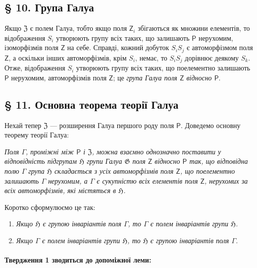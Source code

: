 \documentclass[11pt]{article}
\begin{document}
\subsection*{§ 10. Група Галуа}\label{die-galoissche-gruppe}

Якщо \(\mathfrak Z\) є полем Галуа, тобто якщо поля \(\mathsf{Z}_i\) збігаються як множини елементів, то відображення \(S_i\) утворюють групу всіх таких, що залишають \(\mathsf P\) нерухомим, ізоморфізмів поля \(\mathsf{Z}\) на себе. Справді, кожний добуток \(S_iS_j\) є автоморфізмом поля \(\mathsf{Z}\), а оскільки інших автоморфізмів, крім \(S_i\), немає, то \(S_iS_j\) дорівнює деякому \(S_k\). Отже, відображення \(S_i\) утворюють групу всіх таких, що поелементно залишають \(\mathsf P\) нерухомим, автоморфізмів поля \(\mathsf{Z}\); це \emph{група Галуа поля \(\mathsf{Z}\) відносно \(\mathsf P\)}.

\subsection*{§ 11. Основна теорема теорії Галуа}\label{der-hauptsatz-der-galoisschen-theorie}

Нехай тепер \(\mathfrak Z\) --- розширення Галуа першого роду поля \(\mathsf P\). Доведемо основну теорему теорії Галуа:

\emph{Поля \(\Gamma\), проміжні між \(\mathsf P\) і \(\mathfrak Z\), можна взаємно однозначно поставити у відповідність підгрупам \(\mathfrak H\) групи Галуа \(\mathfrak G\) поля \(\mathsf{Z}\) відносно \(\mathsf P\) так, що відповідна полю \(\Gamma\) група \(\mathfrak H\) складається з усіх автоморфізмів поля \(\mathsf{Z}\), що поелементно залишають \(\Gamma\) нерухомим, а \(\Gamma\) є сукупністю всіх елементів поля \(\mathsf{Z}\), нерухомих за всіх автоморфізмів, які містяться в \(\mathfrak H\).}

Коротко сформулюємо це так:

\begin{enumerate}
\item \emph{Якщо \(\mathfrak H\) є групою інваріантів поля \(\Gamma\), то \(\Gamma\) є полем інваріантів групи \(\mathfrak H\).}
\item \emph{Якщо \(\Gamma\) є полем інваріантів групи \(\mathfrak H\), то \(\mathfrak H\) є групою інваріантів поля \(\Gamma\).}
\end{enumerate}

\paragraph{Твердження 1 зводиться до допоміжної леми:}\label{laesst-sich-zurueckfuehren-auf-den-hilfssatz}
\end{document}
